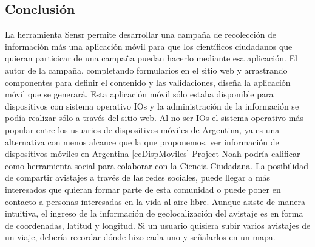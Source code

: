 \subsection{Conclusión}
La herramienta Sensr permite desarrollar una campaña de recolección de información más una aplicación móvil para que los científicos ciudadanos que quieran particicar de una campaña puedan hacerlo mediante esa aplicación. El autor de la campaña, completando formularios en el sitio web y arrastrando componentes para definir el contenido y las validaciones, diseña la aplicación móvil que se generará. Esta aplicación móvil sólo estaba disponible para dispositivos con sistema operativo IOs y la administración de la información se podía realizar sólo a través del sitio web. Al no ser IOs el sistema operativo más popular entre los usuarios de dispositivos móviles de Argentina, ya es una alternativa con menos alcance que la que proponemos. ver información de dispositivos móviles en Argentina \ref{ccDispMoviles}
Project Noah podría calificar como herramienta social para colaborar con la Ciencia Ciudadana. La posibilidad de compartir avistajes a través de las redes sociales, puede llegar a más interesados que quieran formar parte de esta comunidad o puede poner en contacto a personas interesadas en la vida al aire libre.
Aunque asiste de manera intuitiva, el ingreso de la información de geolocalización del avistaje es en forma de coordenadas, latitud y longitud. Si un usuario quisiera subir varios avistajes de un viaje, debería recordar dónde hizo cada uno y señalarlos en un mapa.


